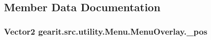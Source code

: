\subsection{Member Data Documentation}
\hypertarget{classgearit_1_1src_1_1utility_1_1_menu_1_1_menu_overlay_a6eb6e8a1de0c6b2c0369ee0f0a24354b}{
\subsubsection[{\+\_\+pos}]{\setlength{\rightskip}{0pt plus 5cm}Vector2 gearit.\+src.\+utility.\+Menu.\+Menu\+Overlay.\+\_\+pos}}\label{classgearit_1_1src_1_1utility_1_1_menu_1_1_menu_overlay_a6eb6e8a1de0c6b2c0369ee0f0a24354b}


